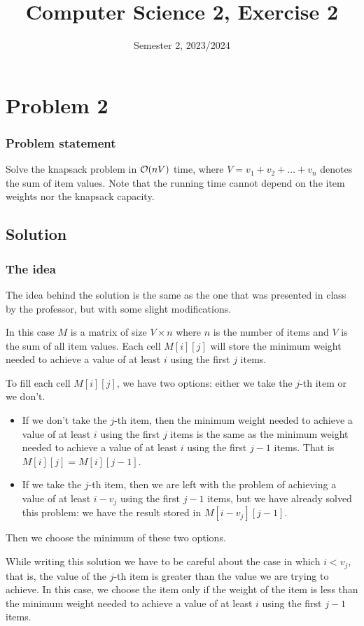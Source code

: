 \documentclass[12pt]{extarticle}
\title{Computer Science 2, Exercise 2}
\date{Semester 2, 2023/2024}
\begin{document}
\section*{Problem 2}

\subsubsection*{Problem statement}

Solve the knapsack problem in $\mathcal{O}(nV)$ time, where $V = v_1 + v_2 + \ldots + v_n$ denotes the sum of item values.
Note that the running time cannot depend on the item weights nor the knapsack capacity.

\subsection*{Solution}

\subsubsection*{The idea}

The idea behind the solution is the same as the one that was presented in class by the professor, but with some slight modifications.

In this case $M$ is a matrix of size $V \times n$ where $n$ is the number of items and $V$ is the sum of all item values.
Each cell $M[i][j]$ will store the minimum weight needed to achieve a value of at least $i$ using the first $j$ items.

To fill each cell $M[i][j]$, we have two options: either we take the $j$-th item or we don't.
\begin{itemize}
    \item
          If we don't take the $j$-th item, then the minimum weight needed to achieve a value of at least $i$ using the first $j$ items is the same as the minimum weight needed to achieve a value of at least $i$ using the first $j - 1$ items.
          That is $M[i][j] = M[i][j - 1]$.
    \item
          If we take the $j$-th item, then we are left with the problem of achieving a value of at least $i - v_j$ using the first $j - 1$ items, but we have already solved this problem: we have the result stored in $M[i - v_j][j - 1]$.
\end{itemize}

Then we choose the minimum of these two options.

While writing this solution we have to be careful about the case in which $i < v_j$, that is, the value of the $j$-th item is greater than the value we are trying to achieve.
In this case, we choose the item only if the weight of the item is less than the minimum weight needed to achieve a value of at least $i$ using the first $j - 1$ items.
\end{document}
